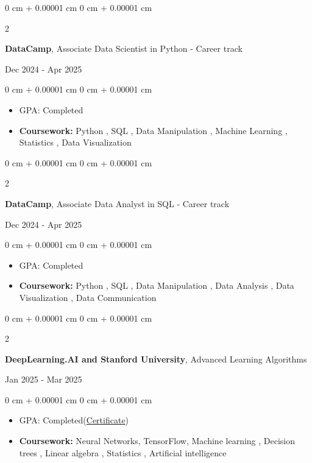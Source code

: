 \documentclass[10pt, letterpaper]{article}
\newenvironment{highlights}{
    \begin{itemize}[
        topsep=0.10 cm,
        parsep=0.10 cm,
        partopsep=0pt,
        itemsep=0pt,
        leftmargin=0 cm + 10pt
    ]
}{
    \end{itemize}
} %
\newenvironment{onecolentry}{
    \begin{adjustwidth}{
        0 cm + 0.00001 cm
    }{
        0 cm + 0.00001 cm
    }
}{
    \end{adjustwidth}
} %
\newenvironment{twocolentry}[2][]{
    \onecolentry
    \def\secondColumn{#2}
    \setcolumnwidth{\fill, 4.5 cm}
    \begin{paracol}{2}
}{
    \switchcolumn \raggedleft \secondColumn
    \end{paracol}
    \endonecolentry
} %
\begin{document}
            \begin{twocolentry}{
                Dec 2024 - Apr 2025
            }
                \textbf{DataCamp}, Associate Data Scientist in Python - Career track
            \end{twocolentry}

            \vspace{0.10 cm}
            \begin{onecolentry}
                \begin{highlights}
                    \item GPA: 
                    Completed
                \item \textbf{Coursework:} Python , SQL , Data Manipulation , Machine Learning , Statistics , Data Visualization
                \end{highlights}
            \end{onecolentry}
            
            \begin{twocolentry}{
                Dec 2024 - Apr 2025
            }
                \textbf{DataCamp}, Associate Data Analyst in SQL - Career track
            \end{twocolentry}

            \vspace{0.10 cm}
            \begin{onecolentry}
                \begin{highlights}
                    \item GPA: 
                    Completed
                \item \textbf{Coursework:} Python , SQL , Data Manipulation , Data Analysis , Data Visualization , Data Communication
                \end{highlights}
            \end{onecolentry}
            
            \begin{twocolentry}{
                Jan 2025 - Mar 2025
            }
                \textbf{DeepLearning.AI and Stanford University}, Advanced Learning Algorithms
            \end{twocolentry}

            \vspace{0.10 cm}
            \begin{onecolentry}
                \begin{highlights}
                    \item GPA: 
                    Completed(\href{https://coursera.org/verify/OMHULMAU912D}{Certificate})
                \item \textbf{Coursework:} Neural Networks, TensorFlow, Machine learning  , Decision trees  , Linear algebra , Statistics , Artificial intelligence
                \end{highlights}
            \end{onecolentry}
            
\end{document}
